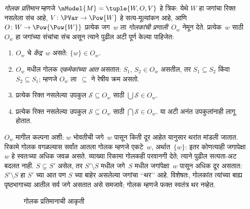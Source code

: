 \begin{defn}
  \emph{गोलक प्रतिमान} म्हणजे
  $\mModel{M} = \tuple{W, O, V}$
  हे त्रिक: येथे $W$ हा जगांचा
  रिक्त नसलेला संच आहे,
  $V\colon \PVar \to \Pow{W}$
  हे सत्य-मूल्यांकन आहे, आणि
  $O\colon W \to \Pow{\Pow{W}}$
  प्रत्येक जग~$w$ ला
  \emph{गोलकांची प्रणाली}~$O_w$
  नेमून देते. प्रत्येक~$w$ साठी
  $O_w$ हा जगांच्या संचांचा संच
  असून त्याने पुढील अटी पूर्ण
  केल्या पाहिजेत:
  \begin{enumerate}
  \item $O_w$ चे \emph{केंद्र}~$w$
    असते: $\{w\} \in O_w$.
  \item $O_w$ मधील गोलक
    \emph{एकमेकांच्या आत} असतात:
    $S_1$, $S_2 \in O_w$ असतील,
    तर $S_1 \subseteq S_2$ किंवा
    $S_2 \subseteq S_1$; म्हणजे
    $O_w$ ला~$\subseteq$ ने
    रेषीय क्रम असतो.
  \item प्रत्येक रिक्त नसलेल्या उपकुल $\mathcal S\subseteq O_w$
    साठी $\bigcup\mathcal S\in O_w$.
  \item प्रत्येक रिक्त नसलेल्या उपकुल $\mathcal S\subseteq O_w$
    साठी $\bigcap\mathcal S\in O_w$.
    या अटी अनंत उपकुलांनाही लागू होतात.
  \end{enumerate}
\end{defn}

$O_w$ मागील कल्पना अशी:
$w$ भोवतीची जगे~$w$ पासून
किती दूर आहेत यानुसार
थरांत मांडली जातात.
रिकामे गोलक वगळल्यास सर्वांत आतला गोलक म्हणजे
एकटे~$w$, अर्थात~$\{w\}$: इतर कोणत्याही जगापेक्षा
$w$ हे स्वतःच्या अधिक जवळ असते. व्याख्या रिकामा
गोलकही परवानगी देते; त्याने पुढील सत्यता-अट बदलत नाही.
$S \subsetneq S'$ असेल,
तर $S' \setminus S$
मधील जगे~$S$ मधील
जगांपेक्षा~$w$ पासून
अधिक दूर असतात:
$S'\setminus S$ हा $S'$ च्या आत पण $S$ च्या बाहेर
असलेल्या जगांचा ‘‘थर’’ आहे.
विशेषतः, गोलकांत
त्यांच्या बाह्य पृष्ठभागाच्या
आतील सर्व जगे असतात
असे समजावे; गोलक
म्हणजे फक्त स्वतंत्र
थर नव्हेत.

\begin{figure}
\begin{center}
\caption{गोलक प्रतिमानाची आकृती}
\label{con:min:sph:fig:sphere-model}
\end{center}
\end{figure}

